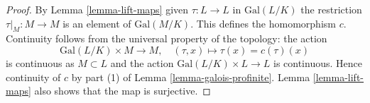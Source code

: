 \documentclass[10pt,a4paper]{amsart}
\theoremstyle{plain}
\theoremstyle{definition}
\theoremstyle{remark}
\numberwithin{equation}{subsection}
\begin{document}
\begin{proof}
By Lemma \ref{lemma-lift-maps} given $\tau : L \to L$ in
$\text{Gal}(L/K)$ the restriction $\tau|_M : M \to M$
is an element of $\text{Gal}(M/K)$. This defines the homomorphism $c$.
Continuity follows from the universal property of the topology:
the action
$$
\text{Gal}(L/K) \times M \longrightarrow M,\quad
(\tau, x) \longmapsto \tau(x) = c(\tau)(x)
$$
is continuous as $M \subset L$ and the action
$\text{Gal}(L/K) \times L \to L$ is continuous.
Hence continuity of $c$ by part (1) of
Lemma \ref{lemma-galois-profinite}.
Lemma \ref{lemma-lift-maps} also
shows that the map is surjective.
\end{proof}
\end{document}
